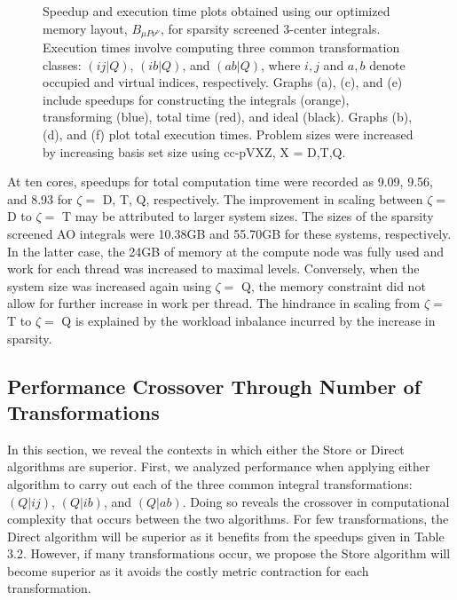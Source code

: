 \begin{figure}[H]
  \hfill
  \hfill
  \caption{Speedup and execution time plots obtained using our optimized memory layout, $B_{\mu P \nu^\nu}$, 
 for sparsity screened 3-center integrals. 
 Execution times involve computing three common transformation classes: $(ij|Q)$, $(ib|Q)$, and $(ab|Q)$,
 where $i,j$ and $a,b$ denote occupied and virtual indices, respectively. Graphs (a), (c), and (e) include speedups for constructing the integrals (orange),
 transforming (blue), total time (red), and ideal (black). Graphs (b), (d), and (f) plot total execution times. Problem sizes were increased by increasing basis set size
 using cc-pVXZ, X = D,T,Q.}
\end{figure}

At ten cores, speedups for total computation time were recorded as 9.09, 9.56, and 8.93 for $\zeta = $ D, T, Q, 
respectively. The improvement in scaling between $\zeta = $ D to $\zeta = $ T
may be attributed to larger system sizes. The sizes of the sparsity screened AO integrals were 10.38GB and 55.70GB 
for these systems, respectively. In the latter case,
the 24GB of memory at the compute node was fully used and work for each thread was increased to maximal levels. Conversely, 
when the system size was increased again using
$\zeta = $ Q, the memory constraint did not allow for further increase in work per thread. 
The hindrance in scaling from $\zeta = $ T to $\zeta = $ Q is explained by the workload inbalance incurred by
the increase in sparsity. 


\subsection{Performance Crossover Through Number of Transformations}

In this section, we reveal the contexts in which either the Store or Direct algorithms are superior. First, we analyzed performance when applying either algorithm
 to carry out each of the three common integral transformations: $(Q|ij)$, $(Q|ib)$, and $(Q|ab)$. Doing so reveals the crossover in computational complexity that occurs between the two
 algorithms. For few transformations, the Direct algorithm will be superior as it benefits from the speedups given
 in Table 3.2. However, if many transformations occur, we propose the Store algorithm will become superior as it avoids the costly metric contraction for each transformation.
 
